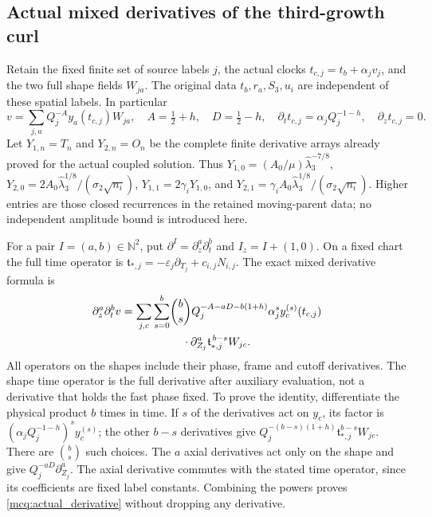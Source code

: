 \documentclass[11pt]{article}
\begin{document}
\subsection{Actual mixed derivatives of the third-growth curl}

Retain the fixed finite set of source labels \(j\), the actual clocks
\(t_{c,j}=t_b+\alpha_jv_j\), and the two full shape fields \(W_{ja}\).
The original data \(t_b,r_a,S_3,u_i\) are independent of these spatial
labels. In particular
\[
 v=\sum_{j,a}Q_j^{-A}y_a(t_{c,j})W_{ja},\quad
 A=\tfrac12+h,\quad D=\tfrac12-h,\quad
 \partial_t t_{c,j}=\alpha_jQ_j^{-1-h},\quad \partial_z t_{c,j}=0 .
\]
Let \(Y_{1,n}=T_n\) and \(Y_{2,n}=O_n\) be the complete finite
derivative arrays already proved for the actual coupled solution.
Thus \(Y_{1,0}=(A_0/\mu)\widehat\lambda_3^{-7/8}\),
\(Y_{2,0}=2A_0\widehat\lambda_3^{1/8}/(\sigma_2\sqrt{n_i})\),
\(Y_{1,1}=2\gamma_iY_{1,0}\), and
\(Y_{2,1}=\gamma_iA_0\widehat\lambda_3^{1/8}/(\sigma_2\sqrt{n_i})\).
Higher entries are those closed recurrences in the retained moving-parent
data; no independent amplitude bound is introduced here.

For a pair \(I=(a,b)\in\mathbb N^2\), put
\(\partial^I=\partial_z^a\partial_t^b\) and
\(I_z=I+(1,0)\). On a fixed chart the full time operator is
\(\mathfrak t_{*,j}=-\varepsilon_j\partial_{T_j}+c_{i,j}N_{i,j}\).
The exact mixed derivative formula is
\begin{equation}\label{mcq:actual_derivative}
\begin{split}
 \partial_z^a\partial_t^b v
 =\sum_{j,c}\sum_{s=0}^b&
 \binom bs Q_j^{-A-aD-b(1+h)}\alpha_j^s
 y_c^{(s)}(t_{c,j})\\
 &\hspace{4mm}\cdot
 \partial_{Z_j}^a\mathfrak t_{*,j}^{\,b-s}W_{jc}.
\end{split}
\end{equation}
All operators on the shapes include their phase, frame and cutoff
derivatives. The shape time operator is the full derivative after
auxiliary evaluation, not a derivative that holds the fast phase fixed.
To prove the identity, differentiate the physical product \(b\) times
in time. If \(s\) of the derivatives act on \(y_c\), its factor is
\((\alpha_jQ_j^{-1-h})^sy_c^{(s)}\); the other \(b-s\) derivatives
give \(Q_j^{-(b-s)(1+h)}\mathfrak t_{*,j}^{b-s}W_{jc}\).
There are \(\binom bs\) such choices. The \(a\) axial derivatives act
only on the shape and give \(Q_j^{-aD}\partial_{Z_j}^a\).
The axial derivative commutes with the stated time operator, since
its coefficients are fixed label constants. Combining the powers proves
\eqref{mcq:actual_derivative} without dropping any derivative.
\end{document}
